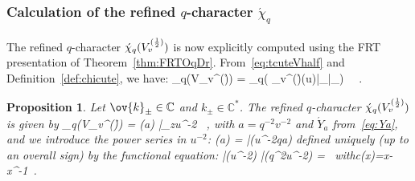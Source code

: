\documentclass[11pt]{amsart}
\numberwithin{equation}{section}
\newtheorem{prop}[thm]{Proposition}
\numberwithin{equation}{section}
\begin{document}
\subsubsection{Calculation of the refined $q$-character $\acute{\chi}_q$}
The refined $q$-character $\acute{\chi}_q(V_{v}^{(\frac{1}{2})})$ is now explicitly computed using the FRT presentation of Theorem~\ref{thm:FRTOqDr}. 
From~\eqref{eq:tcuteVhalf} and Definition~\ref{def:chicute}, we have:
		  \beqa
	 \acute{\chi}_q(V_v^{(\h)}) = _q\Big( _v^{(\h)}(u)\big|_{\bar\varepsilon_}\Big)  \ \label{eq:acutechi12}\ .
		 \eeqa

\begin{prop}\label{prop:acutechi-half} Let $\ov{k}_\pm \in{\mathbb C}$ and $k_\pm\in\mathbb{C}^*$.  The refined $q$-character $\acute{\chi}_q(V_{v}^{(\frac{1}{2})})$ is given by
\beqa
\acute{\chi}_q(V_v^{(\h)})    
	 = \kappa(a)  \Bigg|_{z\rightarrow u^{-2}} \label{eq:chirefhalf} \ ,
		  \eeqa
with $a=q^{-2}v^{-2}$ and $\acute{Y}_a$ from~\eqref{eq:Ya}, and we introduce the power series in $u^{-2}$:
          \beqa
          \kappa(a) = \bar\zeta(u^{-2}qa)
          \eeqa
defined uniquely  (up to an overall sign)  by the functional equation:
\beqa
\bar\zeta(u^{-2})  \bar\zeta(q^{2}u^{-2}) =
\ \quad \mbox{with}\quad c(x)=x-x^{-1}\ .\label{eq:zetzet}
\eeqa
\end{prop}
\end{document}
